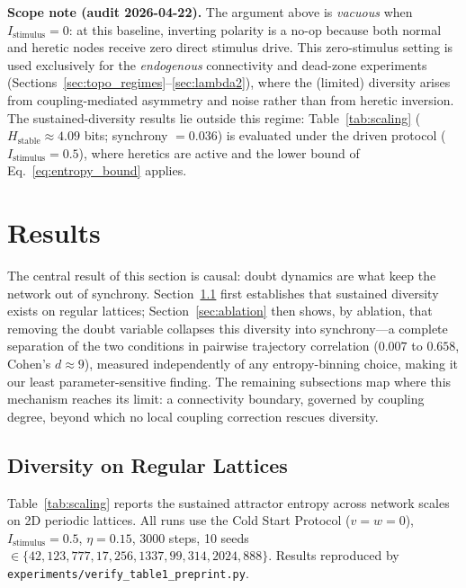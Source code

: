 ﻿\documentclass[11pt]{article}
\begin{document}
\textbf{Scope note (audit 2026-04-22).} The argument above is \emph{vacuous} when $I_{\text{stimulus}} = 0$: at this baseline, inverting polarity is a no-op because both normal and heretic nodes receive zero direct stimulus drive. This zero-stimulus setting is used exclusively for the \emph{endogenous} connectivity and dead-zone experiments (Sections~\ref{sec:topo_regimes}--\ref{sec:lambda2}), where the (limited) diversity arises from coupling-mediated asymmetry and noise rather than from heretic inversion. The sustained-diversity results lie outside this regime: Table~\ref{tab:scaling} ($H_{\text{stable}} \approx 4.09$ bits; synchrony $= 0.036$) is evaluated under the driven protocol ($I_{\text{stimulus}} = 0.5$), where heretics are active and the lower bound of Eq.~\ref{eq:entropy_bound} applies.

\section{Results}
\label{sec:results}

The central result of this section is causal: doubt dynamics are what keep the network out of synchrony. Section~\ref{sec:results_lattice} first establishes that sustained diversity exists on regular lattices; Section~\ref{sec:ablation} then shows, by ablation, that removing the doubt variable collapses this diversity into synchrony---a complete separation of the two conditions in pairwise trajectory correlation ($0.007$ to $0.658$, Cohen's $d \approx 9$), measured independently of any entropy-binning choice, making it our least parameter-sensitive finding. The remaining subsections map where this mechanism reaches its limit: a connectivity boundary, governed by coupling degree, beyond which no local coupling correction rescues diversity.

\subsection{Diversity on Regular Lattices}
\label{sec:results_lattice}

Table~\ref{tab:scaling} reports the sustained attractor entropy across network scales on 2D periodic lattices. All runs use the Cold Start Protocol ($v = w = 0$), $I_{\text{stimulus}} = 0.5$, $\eta = 0.15$, 3000 steps, 10 seeds $\in \{42, 123, 777, 17, 256, 1337, 99, 314, 2024, 888\}$. Results reproduced by \texttt{experiments/verify\_table1\_preprint.py}.
\end{document}
